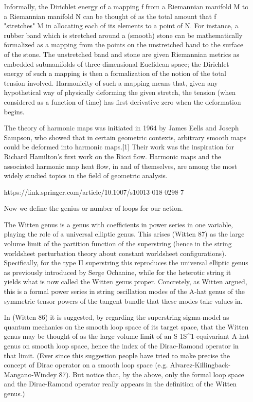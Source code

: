 Informally, the Dirichlet energy of a mapping f from a Riemannian manifold M to a Riemannian manifold N can be thought of as the total amount that f "stretches" M in allocating each of its elements to a point of N. For instance, a rubber band which is stretched around a (smooth) stone can be mathematically formalized as a mapping from the points on the unstretched band to the surface of the stone. The unstretched band and stone are given Riemannian metrics as embedded submanifolds of three-dimensional Euclidean space; the Dirichlet energy of such a mapping is then a formalization of the notion of the total tension involved. Harmonicity of such a mapping means that, given any hypothetical way of physically deforming the given stretch, the tension (when considered as a function of time) has first derivative zero when the deformation begins.

The theory of harmonic maps was initiated in 1964 by James Eells and Joseph Sampson, who showed that in certain geometric contexts, arbitrary smooth maps could be deformed into harmonic maps.[1] Their work was the inspiration for Richard Hamilton's first work on the Ricci flow. Harmonic maps and the associated harmonic map heat flow, in and of themselves, are among the most widely studied topics in the field of geometric analysis. 


https://link.springer.com/article/10.1007/s10013-018-0298-7

Now we define the genius or number of loops for our action.

The Witten genus is a genus with coefficients in power series in one variable, playing the role of a universal elliptic genus. This arises (Witten 87) as the large volume limit of the partition function of the superstring (hence in the string worldsheet perturbation theory about constant worldsheet configurations). Specifically, for the type II superstring this reproduces the universal elliptic genus as previously introduced by Serge Ochanine, while for the heterotic string it yields what is now called the Witten genus proper. Concretely, as Witten argued, this is a formal power series in string oscillation modes of the A-hat genus of the symmetric tensor powers of the tangent bundle that these modes take values in.

In (Witten 86) it is suggested, by regarding the superstring sigma-model as quantum mechanics on the smooth loop space of its target space, that the Witten genus may be thought of as the large volume limit of an S 1S^1-equivariant A-hat genus on smooth loop space, hence the index of the Dirac-Ramond operator in that limit. (Ever since this suggestion people have tried to make precise the concept of Dirac operator on a smooth loop space (e.g. Alvarez-Killingback-Mangano-Windey 87). But notice that, by the above, only the formal loop space and the Dirac-Ramond operator really appears in the definition of the Witten genus.)

